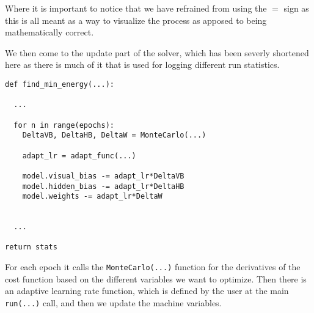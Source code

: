 Where it is important to notice that we have refrained from using the $=$ sign as this is all meant as a way to visualize the process as apposed to being mathematically correct.

We then come to the update part of the solver, which has been severly shortened here as there is much of it that is used for logging different run statistics.

\begin{verbatim}
def find_min_energy(...):
  
  ...

  for n in range(epochs):
    DeltaVB, DeltaHB, DeltaW = MonteCarlo(...)

    adapt_lr = adapt_func(...)

    model.visual_bias -= adapt_lr*DeltaVB
    model.hidden_bias -= adapt_lr*DeltaHB
    model.weights -= adapt_lr*DeltaW


  ...

return stats
\end{verbatim}

For each epoch it calls the \texttt{MonteCarlo(...)} function for the derivatives of the cost function based on the different variables we want to optimize. Then there is an adaptive learning rate function, which is defined by the user at the main \texttt{run(...)} call, and then we update the machine variables.

